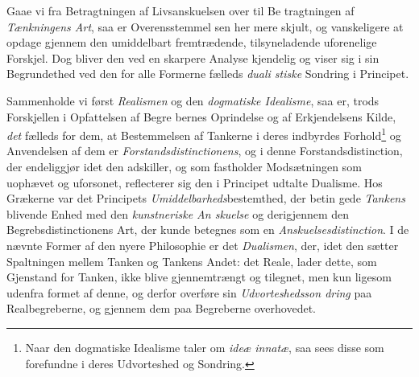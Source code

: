 Gaae vi fra Betragtningen af Livsanskuelsen over til Be\-%
tragtningen af \emph{Tænkningens Art}, saa er Overensstemmel\-%
sen her mere skjult, og vanskeligere at opdage gjennem den
umiddelbart fremtrædende, tilsyneladende uforenelige Forskjel.
Dog bliver den ved en skarpere Analyse kjendelig og viser sig
i sin Begrundethed ved den for alle Formerne fælleds \emph{duali\-%
stiske} Sondring i Principet.

Sammenholde vi først \emph{Realismen} og den \emph{dogmatiske
Idealisme}, saa er, trods Forskjellen i Opfattelsen af Begre\-%
bernes Oprindelse og af Erkjendelsens Kilde, \emph{det} fælleds for
dem, at Bestemmelsen af Tankerne i deres indbyrdes Forhold\footnote{Naar den dogmatiske Idealisme taler om \emph{ideæ innatæ}, saa sees
disse som forefundne i deres Udvorteshed og Sondring.}
 \setcounter{footnote}{0}
og Anvendelsen af dem er \emph{Forstandsdistinctionens}, og
i denne Forstandsdistinction, der endeliggjør idet den adskiller,
og som fastholder Modsætningen som uophævet og uforsonet,
reflecterer sig den i Principet udtalte Dualisme. Hos Grækerne
var det Principets \emph{Umiddelbarheds}bestemthed, der betin\-%
gede \emph{Tankens} blivende Enhed med den \emph{kunstneriske An\-%
skuelse} og derigjennem den Begrebsdistinctionens Art, der
kunde betegnes som en \emph{Anskuelsesdistinction}. I de
nævnte Former af den nyere Philosophie er det \emph{Dualismen},
der, idet den sætter Spaltningen mellem Tanken og Tankens
Andet: det Reale, lader dette, som Gjenstand for Tanken, ikke
blive gjennemtrængt og tilegnet, men kun ligesom udenfra
formet af denne, og derfor overføre sin \emph{Udvorteshedsson\-%
dring} paa Realbegreberne, og gjennem dem paa Begreberne
overhovedet.

